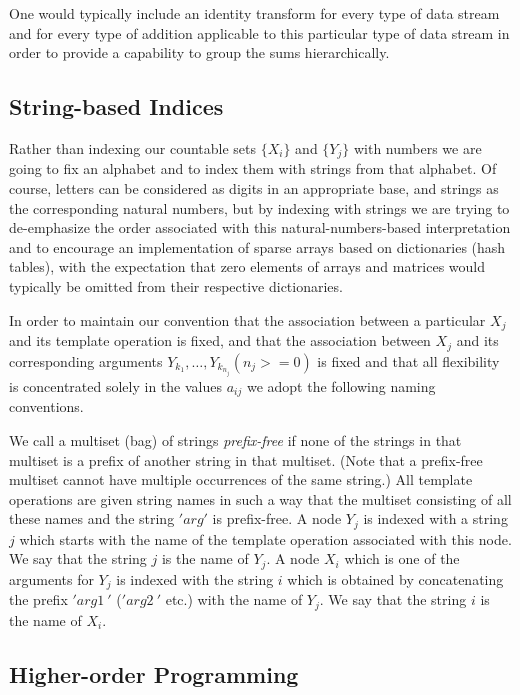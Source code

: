 \documentclass[withtimes]{easychair}
\begin{document}
One would typically include an identity transform for every type of data stream and for every type of addition
applicable to this particular type of data stream in order to provide a capability to group the sums
hierarchically.

\subsection{String-based Indices}\label{string_indices}

Rather than indexing our countable sets $\{X_i\}$ and $\{Y_j\}$ with numbers we are going to fix an alphabet and to index them with
strings from that alphabet. Of course, letters can be considered as digits in an appropriate base, and strings as the corresponding natural
numbers, but by indexing with strings we are trying to de-emphasize the order associated with this natural-numbers-based
interpretation and to encourage an implementation of sparse arrays based on dictionaries (hash tables), with the expectation
that zero elements of arrays and matrices would typically be omitted from their respective dictionaries.

In order to maintain our convention that the association between a particular $X_j$ and its template operation is fixed, and
that the association between $X_j$ and its corresponding arguments $Y_{k_1}, \dots, Y_{k_{n_j}} (n_j >= 0)$ is fixed and
that all flexibility is concentrated solely in the values $a_{ij}$ we adopt the following naming conventions.

We call a multiset (bag) of strings {\em prefix-free} if none of the strings in that multiset is a prefix of another string in that multiset.
(Note that a prefix-free multiset cannot have multiple occurrences of the same string.)
All template operations are given string names in such a way that the multiset consisting of all these names and the string $'arg'$
is prefix-free. A node $Y_j$ is indexed with a string $j$ which starts with the name of the template operation associated with
this node. We say that the string $j$ is the name of $Y_j$.
 A node $X_i$ which is one of the arguments for $Y_j$ is indexed with the string $i$ which is obtained by
concatenating the prefix $'arg1\ '$ ($'arg2\ '$ etc.) with the name of $Y_j$. We say that the string $i$ is the name of $X_i$.

\subsection{Higher-order Programming}
\end{document}
